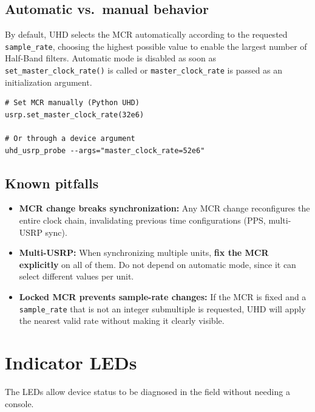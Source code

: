 \documentclass[11pt]{article}
\begin{document}
\subsection*{Automatic vs.\ manual behavior}
By default, UHD selects the MCR automatically according to the requested \texttt{sample\_rate}, choosing the highest possible value to enable the largest number of Half-Band filters. Automatic mode is disabled as soon as \texttt{set\_master\_clock\_rate()} is called or \texttt{master\_clock\_rate} is passed as an initialization argument.

\begin{verbatim}
# Set MCR manually (Python UHD)
usrp.set_master_clock_rate(32e6)

# Or through a device argument
uhd_usrp_probe --args="master_clock_rate=52e6"
\end{verbatim}

\subsection*{Known pitfalls}
\begin{itemize}
    \item \textbf{MCR change breaks synchronization:} Any MCR change reconfigures the entire clock chain, invalidating previous time configurations (PPS, multi-USRP sync).
    \item \textbf{Multi-USRP:} When synchronizing multiple units, \textbf{fix the MCR explicitly} on all of them. Do not depend on automatic mode, since it can select different values per unit.
    \item \textbf{Locked MCR prevents sample-rate changes:} If the MCR is fixed and a \texttt{sample\_rate} that is not an integer submultiple is requested, UHD will apply the nearest valid rate without making it clearly visible.
\end{itemize}

\section{Indicator LEDs}

The LEDs allow device status to be diagnosed in the field without needing a console.
\end{document}
